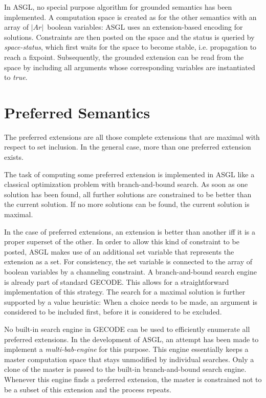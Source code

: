 \documentclass[runningheads,a4paper]{llncs}
\begin{document}
In ASGL, no special purpose algorithm for grounded semantics has been
implemented. A computation space is created as for the other semantics
with an array of $|Ar|$~boolean variables: ASGL uses an
extension-based encoding for solutions. Constraints are then posted on
the space and the status is queried by \textit{space-status}, which
first waits for the space to become stable, i.e. propagation to reach
a fixpoint. Subsequently, the grounded extension can be read from the
space by including all arguments whose corresponding variables are
instantiated to \textit{true}.

\section{Preferred Semantics}\label{sec:preferred}

The preferred extensions are all those complete extensions that are
maximal with respect to set inclusion. In the general case, more than
one preferred extension exists.

The task of computing some preferred extension is implemented in ASGL
like a classical optimization problem with branch-and-bound search. As
soon as one solution has been found, all further solutions are
constrained to be better than the current solution. If no more
solutions can be found, the current solution is maximal.

In the case of preferred extensions, an extension is better than
another iff it is a proper superset of the other. In order to allow
this kind of constraint to be posted, ASGL makes use of an additional
set variable that represents the extension as a set. For consistency,
the set variable is connected to the array of boolean variables by a
channeling constraint. A branch-and-bound search engine is already
part of standard GECODE. This allows for a straightforward
implementation of this strategy. The search for a maximal solution is
further supported by a value heuristic: When a choice needs to be
made, an argument is considered to be included first, before it is
considered to be excluded.

No built-in search engine in GECODE can be used to efficiently
enumerate all preferred extensions. In the development of ASGL, an
attempt has been made to implement a \textit{multi-bab-engine} for
this purpose. This engine essentially keeps a master computation space
that stays unmodified by individual searches. Only a clone of the
master is passed to the built-in branch-and-bound search
engine. Whenever this engine finds a preferred extension, the master
is constrained not to be a subset of this extension and the process
repeats.
\end{document}
